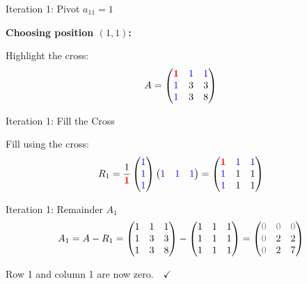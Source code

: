 \documentclass[10pt]{beamer}
\theoremstyle{definition}
\newcommand{\pvt}[1]{{\color{red}\mathbf{#1}}}       %
\newcommand{\crs}[1]{{\color{blue}#1}}                %
\newcommand{\rem}[1]{{\color{gray}#1}}                %
\begin{document}
\begin{frame}[fragile]{Iteration 1: Pivot $a_{11} = 1$}

\textbf{Choosing position $(1,1)$:}

\begin{center}
\end{center}

Highlight the cross:
$$A = \begin{pmatrix}
\pvt{1} & \crs{1} & \crs{1} \\
\crs{1} & 3 & 3 \\
\crs{1} & 3 & 8
\end{pmatrix}$$
\end{frame}
\begin{frame}[fragile]{Iteration 1: Fill the Cross}

Fill using the cross:
$$R_1 = \frac{1}{\pvt{1}}
\begin{pmatrix} \crs{1} \\ \crs{1} \\ \crs{1} \end{pmatrix}
\begin{pmatrix} \crs{1} & \crs{1} & \crs{1} \end{pmatrix}
= \begin{pmatrix}
\pvt{1} & \crs{1} & \crs{1} \\
\crs{1} & 1 & 1 \\
\crs{1} & 1 & 1
\end{pmatrix}$$
\end{frame}

\begin{frame}{Iteration 1: Remainder $A_1$}
$$A_1 = A - R_1 = \begin{pmatrix}
1 & 1 & 1 \\
1 & 3 & 3 \\
1 & 3 & 8
\end{pmatrix}
- \begin{pmatrix}
1 & 1 & 1 \\
1 & 1 & 1 \\
1 & 1 & 1
\end{pmatrix}
= \begin{pmatrix}
\rem{0} & \rem{0} & \rem{0} \\
\rem{0} & 2 & 2 \\
\rem{0} & 2 & 7
\end{pmatrix}$$

\vfill
Row 1 and column 1 are now \rem{zero}.\ \ $\checkmark$
\end{frame}
\end{document}
